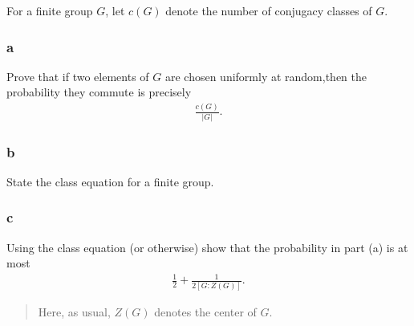For a finite group \(G\), let \(c(G)\) denote the number of conjugacy
classes of \(G\).

\hypertarget{a}{%
\subsubsection{a}\label{a}}

Prove that if two elements of \(G\) are chosen uniformly at random,then
the probability they commute is precisely
\begin{align*}
\frac{c(G)}{{\left\lvert {G} \right\rvert}}
.\end{align*}

\hypertarget{b}{%
\subsubsection{b}\label{b}}

State the class equation for a finite group.

\hypertarget{c}{%
\subsubsection{c}\label{c}}

Using the class equation (or otherwise) show that the probability in
part (a) is at most
\begin{align*}
\frac 1 2 + \frac 1 {2[G : Z(G)]}
.\end{align*}

\begin{quote}
Here, as usual, \(Z(G)\) denotes the center of \(G\).
\end{quote}

